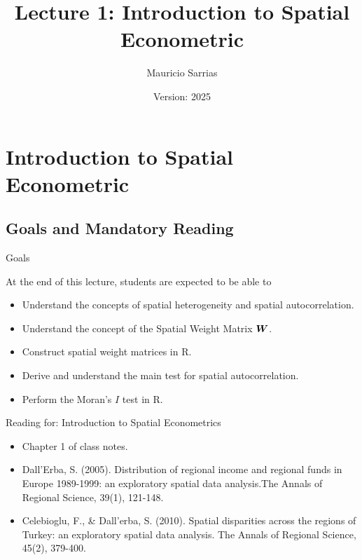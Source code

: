 \documentclass[english,10pt]{beamer}\usepackage[]{graphicx}\usepackage[]{xcolor}
\title{Lecture 1: Introduction to Spatial Econometric}
\author{Mauricio Sarrias}
\institute{Universidad de Talca}
\date{Version: 2025}
\newcommand{\pkg}[1]{{\fontseries{b}\selectfont #1}}
\begin{document}
	
	\frame{\titlepage}
	
		
		
		\frame{\tableofcontents}
		
\section{Introduction to Spatial Econometric}


\subsection{Goals and Mandatory Reading}

\begin{frame}{Goals}
\begin{alertblock}{At the end of this lecture, students are expected to be able to }
\begin{itemize}
  \item Understand the concepts of spatial heterogeneity and spatial autocorrelation. 
  \item Understand the concept of the Spatial Weight Matrix $\bm W$.
  \item Construct spatial weight matrices in \pkg{R}.
  \item Derive and understand the main test for spatial autocorrelation.
  \item Perform the Moran's $I$ test in R. 
\end{itemize}
\end{alertblock}
\end{frame}


\begin{frame}{Reading for: Introduction to Spatial Econometrics}
    \begin{itemize}
      \item Chapter 1 of class notes.
      \item Dall'Erba, S. (2005). Distribution of regional income and regional funds in Europe 1989-1999: an exploratory spatial data analysis.The Annals of Regional Science, 39(1), 121-148.
      \item Celebioglu, F., \& Dall'erba, S. (2010). Spatial disparities across the regions of Turkey: an exploratory spatial data analysis. The Annals of Regional Science, 45(2), 379-400.
    \end{itemize}
\end{frame}
\end{document}

